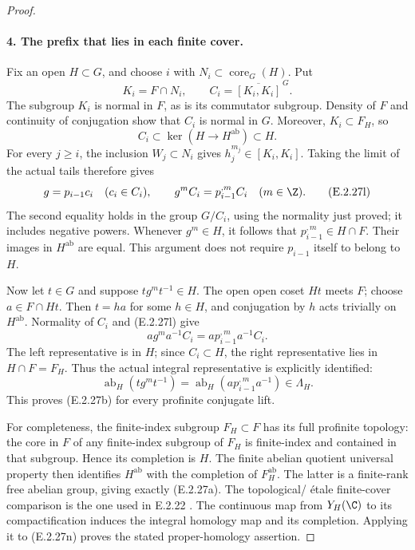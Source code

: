 \begin{proof}
\paragraph{4. The prefix that lies in each finite cover.}
Fix an open \(H\subset G\), and choose \(i\) with
\(N_i\subset\operatorname{core}_G(H)\). Put
\[
 K_i=F\cap N_i,\qquad C_i=\overline{[K_i,K_i]}^{\,G}.
 \tag{E.2.27j}
\]
The subgroup \(K_i\) is normal in \(F\), as is its commutator
subgroup. Density of \(F\) and continuity of conjugation show
that \(C_i\) is normal in \(G\). Moreover,
\(K_i\subset F_H\), so
\[
 C_i\subset\ker(H\longrightarrow H^{\mathrm{ab}})\subset H.
 \tag{E.2.27k}
\]
For every \(j\geq i\), the inclusion \(W_j\subset N_i\) gives
\(h_j^{m_j}\in[K_i,K_i]\). Taking the limit of the actual tails
therefore gives
\[
 g=p_{i-1}c_i\quad(c_i\in C_i),\qquad
 g^mC_i=p_{i-1}^{,m}C_i\quad(m\in\Z).
 \tag{E.2.27l}
\]
The second equality holds in the group \(G/C_i\), using the
normality just proved; it includes negative powers. Whenever
\(g^m\in H\), it follows that \(p_{i-1}^{,m}\in H\cap F\).
Their images in \(H^{\mathrm{ab}}\) are equal. This argument
does not require \(p_{i-1}\) itself to belong to \(H\).

Now let \(t\in G\) and suppose \(tg^mt^{-1}\in H\). The open
open coset \(Ht\) meets \(F\); choose \(a\in F\cap Ht\).
Then \(t=ha\) for some \(h\in H\), and conjugation by \(h\)
acts trivially on \(H^{\mathrm{ab}}\). Normality of \(C_i\)
and (E.2.27l) give
\[
 ag^ma^{-1}C_i=ap_{i-1}^{,m}a^{-1}C_i.
 \tag{E.2.27m}
\]
The left representative is in \(H\); since \(C_i\subset H\),
the right representative lies in \(H\cap F=F_H\).
Thus the actual integral representative is explicitly identified:
\[
 \operatorname{ab}_H(tg^mt^{-1})
   =\operatorname{ab}_H(ap_{i-1}^{,m}a^{-1})\in\Lambda_H.
 \tag{E.2.27n}
\]
This proves (E.2.27b) for every profinite conjugate lift.

For completeness, the finite-index subgroup \(F_H\subset F\)
has its full profinite topology: the core in \(F\) of any
finite-index subgroup of \(F_H\) is finite-index and contained
in that subgroup. Hence its completion is \(H\). The finite
abelian quotient universal property then identifies
\(H^{\mathrm{ab}}\) with the completion of \(F_H^{\mathrm{ab}}\).
The latter is a finite-rank free abelian group, giving exactly
(E.2.27a). The topological/
\'{e}tale finite-cover comparison is the one used in E.2.22
\cite[Corollary 3.7, p.~10]{OSU2024}.
The continuous map from \(Y_H(\C)\) to its compactification
induces the integral homology map and its completion. Applying
it to (E.2.27n) proves the stated proper-homology assertion.


\end{proof}
